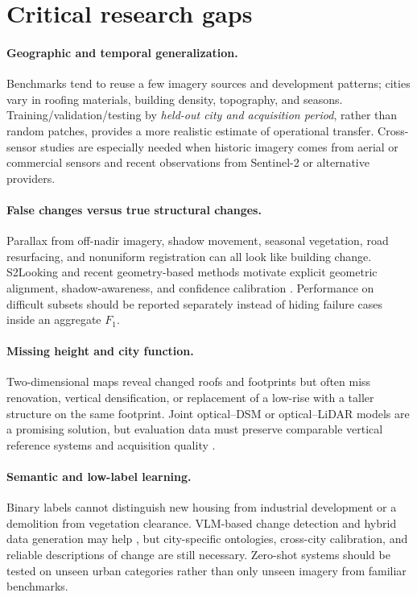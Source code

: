 \documentclass[11pt,a4paper]{article}
\begin{document}
\section{Critical research gaps}

\paragraph{Geographic and temporal generalization.} Benchmarks tend to reuse a few imagery sources and development patterns; cities vary in roofing materials, building density, topography, and seasons. Training/validation/testing by \emph{held-out city and acquisition period}, rather than random patches, provides a more realistic estimate of operational transfer. Cross-sensor studies are especially needed when historic imagery comes from aerial or commercial sensors and recent observations from Sentinel-2 or alternative providers.

\paragraph{False changes versus true structural changes.} Parallax from off-nadir imagery, shadow movement, seasonal vegetation, road resurfacing, and nonuniform registration can all look like building change. S2Looking and recent geometry-based methods motivate explicit geometric alignment, shadow-awareness, and confidence calibration \citep{Shen2021,Quan2025}. Performance on difficult subsets should be reported separately instead of hiding failure cases inside an aggregate $F_1$.

\paragraph{Missing height and city function.} Two-dimensional maps reveal changed roofs and footprints but often miss renovation, vertical densification, or replacement of a low-rise with a taller structure on the same footprint. Joint optical--DSM or optical--LiDAR models are a promising solution, but evaluation data must preserve comparable vertical reference systems and acquisition quality \citep{Gomroki2026,Fu2025}.

\paragraph{Semantic and low-label learning.} Binary labels cannot distinguish new housing from industrial development or a demolition from vegetation clearance. VLM-based change detection and hybrid data generation may help \citep{Jiang2025,Benidir2025}, but city-specific ontologies, cross-city calibration, and reliable descriptions of change are still necessary. Zero-shot systems should be tested on unseen urban categories rather than only unseen imagery from familiar benchmarks.
\end{document}
